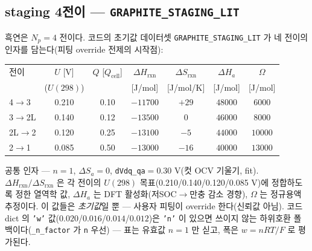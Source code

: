 \documentclass[11pt,a4paper]{article}
\newcommand{\cell}{\mathrm{cell}}
\begin{document}
\subsection{staging 4전이 — \texttt{GRAPHITE\_STAGING\_LIT}}
흑연은 $N_p=4$ 전이다. 코드의 초기값 데이터셋 \texttt{GRAPHITE\_STAGING\_LIT} 가 네 전이의 인자를 담는다(피팅 override 전제의 시작점):
\begin{center}
\renewcommand{\arraystretch}{1.25}
\begin{tabular}{l c c c c c c}
\toprule
전이 & $U$ [V] & $Q$ [$Q_\cell$] & $\Delta H_{\mathrm{rxn}}$ & $\Delta S_{\mathrm{rxn}}$ & $\Delta H_a$ & $\Omega$ \\
 & ($U(298)$) & & [J/mol] & [J/mol/K] & [J/mol] & [J/mol] \\
\midrule
4$\to$3   & 0.210 & 0.10 & $-11700$ & $+29$ & $48000$ & $6000$ \\
3$\to$2L  & 0.140 & 0.12 & $-13500$ & $0$   & $46000$ & $8000$ \\
2L$\to$2  & 0.120 & 0.25 & $-13100$ & $-5$  & $44000$ & $10000$ \\
2$\to$1   & 0.085 & 0.50 & $-13000$ & $-16$ & $40000$ & $13000$ \\
\bottomrule
\end{tabular}
\end{center}
공통 인자 — $n=1$, $\Delta S_a=0$, \texttt{dVdq\_qa}$=0.30$ V(컷 OCV 기울기, fit). $\Delta H_{\mathrm{rxn}}/\Delta S_{\mathrm{rxn}}$ 은 각 전이의 $U(298)$ 목표(0.210/0.140/0.120/0.085 V)에 정합하도록 정한 열역학 값, $\Delta H_a$ 는 DFT 활성화(저SOC$\to$만충 감소 경향), $\Omega$ 는 정규용액 추정이다. 이 값들은 \emph{초기값}일 뿐 — 사용자 피팅이 override 한다(신뢰값 아님). 코드 dict 의 \texttt{'w'} 값($0.020$/$0.016$/$0.014$/$0.012$)은 \texttt{'n'} 이 있으면 쓰이지 않는 하위호환 폴백이다(\texttt{\_n\_factor} 가 \texttt{n} 우선) — 표는 유효값 $n=1$ 만 싣고, 폭은 $w=nRT/F$ 로 평가된다.
\end{document}
